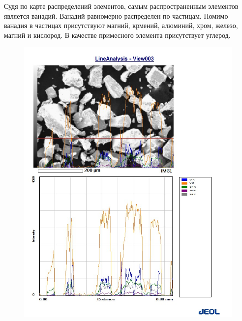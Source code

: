 \documentclass[12pt]{article}
\begin{document}
Судя по карте распределений элементов, самым распространенным элементов является ванадий. Ванадий равномерно распределен по частицам. Помимо ванадия в частицах присутствуют магний, крмений, алюминий, хром, железо, магний и кислород. В качестве примесного элемента присутствует углерод. 

\begin{figure}[H]
	\includegraphics[width = 0.9\linewidth]{./pictures/line_spec_1.jpg}
\end{figure}
\end{document}
